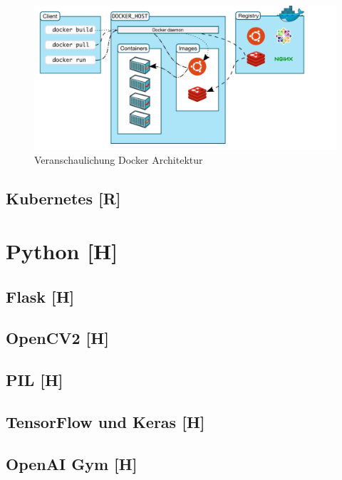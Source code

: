 \begin{figure}[H]
    \centering
    \includegraphics[scale=0.6]{pics/docker architecture.PNG}
    \caption{Veranschaulichung Docker Architektur}
\end{figure}


\subsection{Kubernetes [R]}


\section{Python [H]}

\subsection{Flask [H]}

\subsection{OpenCV2 [H]}

\subsection{PIL [H]}

\subsection{TensorFlow und Keras [H]}

\subsection{OpenAI Gym [H]}

